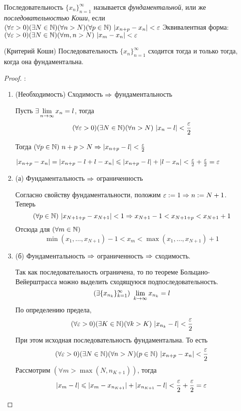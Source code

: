 \begin{definition}
	Последовательность $\{x_n\}_{n = 1}^\infty$ называется
	\textit{фундаментальной}, или же \textit{последовательностью
	Коши}, если $(\forall \varepsilon > 0)(\exists N \in \mathbb{N})
	(\forall n > N)(\forall p \in \mathbb{N})\ |x_{n + p} - x_n| < \varepsilon$
	Эквивалентная форма: $(\forall \varepsilon > 0)(\exists N \in \mathbb{N})
	(\forall m, n > N)\ |x_m - x_n| < \varepsilon$
\end{definition}

\begin{theorem} (Критерий Коши)
	Последовательность $\{x_n\}_{n = 1}^\infty$ сходится тогда и
	только тогда, когда она фундаментальна. 
\end{theorem}

\begin{proof}:
	\begin{enumerate}
		\item (Необходимость) Сходимость $\Rightarrow$ фундаментальность
		
		Пусть $\exists \lim\limits_{n \rightarrow \infty} x_n = l$, тогда
		\[
			(\forall \varepsilon > 0)(\exists N \in \mathbb{N})
			(\forall n > N)\ |x_n - l| < \frac{\varepsilon}{2}
		\]
		
		Тогда $(\forall p \in \mathbb{N})\ n + p > N \Rightarrow |x_{n + p} - l|
		< \frac{\varepsilon}{2}$
		
		$|x_{n + p} - x_n| = |x_{n + p} - l + l - x_n| \leqslant
		|x_{n + p} - l| + |l - x_n| < \frac{\varepsilon}{2} +
		\frac{\varepsilon}{2} = \varepsilon$
		
		\item (а) Фундаментальность $\Rightarrow$ ограниченность
		
		Согласно свойству фундаментальности, положим
		$\varepsilon := 1 \Rightarrow n := N + 1$. Теперь
		\[
			(\forall p \in \mathbb{N})\ |x_{N + 1 + p} - x_{N + 1}| < 1
			\Rightarrow x_{N + 1} - 1 < x_{N + 1 + p} < x_{N + 1} + 1
		\]
		Отсюда для $(\forall m \in \mathbb{N})$
		\[
			\min(x_1, \dots, x_{N + 1}) - 1 < x_m <
			\max(x_1, \dots, x_{N + 1}) + 1
 		\]
 		
 		\item (б) Фундаментальность $\Rightarrow$ ограниченность $\Rightarrow$
		сходимость. 
 		
		Так как последовательность ограничена, то по теореме
		Больцано-Вейерштрасса можно выделить сходящуюся
		подпоследовательность.
		\[
			(\exists \{x_{n_k}\}_{k = 1}^\infty)\ \liml_{k \to \infty} x_{n_k} = l
		\]
		По определению предела,
		\[
			(\forall \varepsilon > 0)(\exists K \in \mathbb{N})(\forall k > K)
			\ |x_{n_k} - l| < \frac{\varepsilon}{2}
		\]
		При этом исходная последовательность фундаментальна. То есть
		\[
			(\forall \varepsilon > 0)(\exists N \in \mathbb{N})(\forall n > N)
			(p \in \mathbb{N})\ |x_{n + p} - x_n| < \frac{\varepsilon}{2}
		\]
		Рассмотрим $(\forall m > \max(N, n_{K + 1}))$, тогда
		\[
			|x_m - l| \leqslant |x_m - x_{n_{K + 1}}| +
			|x_{n_{K + 1}} - l| < \frac{\varepsilon}{2} + \frac{\varepsilon}{2} = \varepsilon
		\]
	\end{enumerate}
\end{proof}

